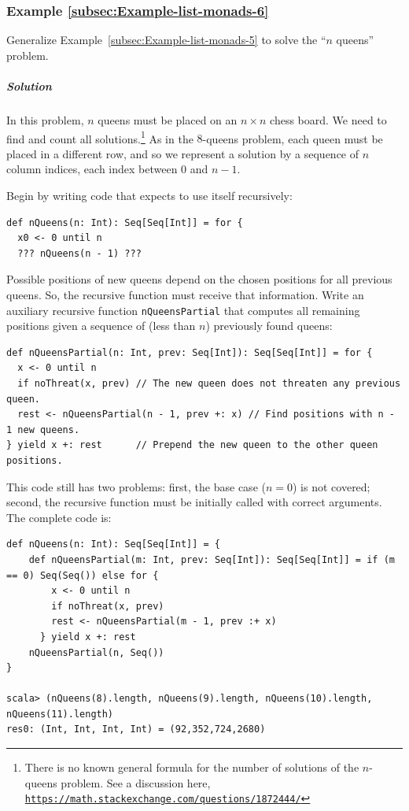 \subsubsection{Example \label{subsec:Example-list-monads-6}\ref{subsec:Example-list-monads-6}}

Generalize Example~\ref{subsec:Example-list-monads-5} to solve the
\textsf{``}$n$ queens\textsf{''} problem.

\subparagraph{Solution}

In this problem, $n$ queens must be placed on an $n\times n$ chess
board. We need to find and count all solutions.\footnote{There is no known general formula for the number of solutions of the
$n$-queens problem. See a discussion here, \texttt{\href{https://math.stackexchange.com/questions/1872444/}{https://math.stackexchange.com/questions/1872444/}}} As in the $8$-queens problem, each queen must be placed in a different
row, and so we represent a solution by a sequence of $n$ column indices,
each index between $0$ and $n-1$.

Begin by writing code that expects to use itself recursively:
\begin{lstlisting}
def nQueens(n: Int): Seq[Seq[Int]] = for {
  x0 <- 0 until n
  ??? nQueens(n - 1) ???
\end{lstlisting}
Possible positions of new queens depend on the chosen positions for
all previous queens. So, the recursive function must receive that
information. Write an auxiliary recursive function \lstinline!nQueensPartial!
that computes all remaining positions given a sequence of (less than
$n$) previously found queens:
\begin{lstlisting}
def nQueensPartial(n: Int, prev: Seq[Int]): Seq[Seq[Int]] = for {
  x <- 0 until n
  if noThreat(x, prev) // The new queen does not threaten any previous queen.
  rest <- nQueensPartial(n - 1, prev +: x) // Find positions with n - 1 new queens.
} yield x +: rest      // Prepend the new queen to the other queen positions.
\end{lstlisting}

This code still has two problems: first, the base case ($n=0$) is
not covered; second, the recursive function must be initially called
with correct arguments. The complete code is:
\begin{lstlisting}
def nQueens(n: Int): Seq[Seq[Int]] = {
    def nQueensPartial(m: Int, prev: Seq[Int]): Seq[Seq[Int]] = if (m == 0) Seq(Seq()) else for {
        x <- 0 until n
        if noThreat(x, prev)
        rest <- nQueensPartial(m - 1, prev :+ x)
      } yield x +: rest
    nQueensPartial(n, Seq())
}

scala> (nQueens(8).length, nQueens(9).length, nQueens(10).length, nQueens(11).length)
res0: (Int, Int, Int, Int) = (92,352,724,2680)
\end{lstlisting}


